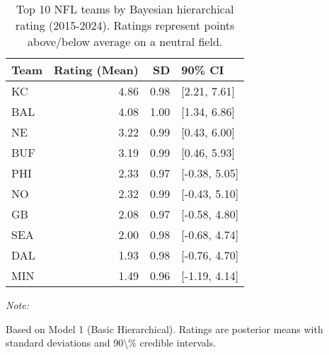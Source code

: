 \begin{table}[!h]
\centering
\caption{\label{tab:bayesian-top-teams}Top 10 NFL teams by Bayesian hierarchical rating (2015-2024). Ratings represent points above/below average on a neutral field.}
\centering
\begin{threeparttable}
\begin{tabular}[t]{lrrl}
\toprule
Team & Rating (Mean) & SD & 90\% CI\\
\midrule
KC & 4.86 & 0.98 & {}[2.21, 7.61]\\
BAL & 4.08 & 1.00 & {}[1.34, 6.86]\\
NE & 3.22 & 0.99 & {}[0.43, 6.00]\\
BUF & 3.19 & 0.99 & {}[0.46, 5.93]\\
PHI & 2.33 & 0.97 & {}[-0.38, 5.05]\\
\addlinespace
NO & 2.32 & 0.99 & {}[-0.43, 5.10]\\
GB & 2.08 & 0.97 & {}[-0.58, 4.80]\\
SEA & 2.00 & 0.98 & {}[-0.68, 4.74]\\
DAL & 1.93 & 0.98 & {}[-0.76, 4.70]\\
MIN & 1.49 & 0.96 & {}[-1.19, 4.14]\\
\bottomrule
\end{tabular}
\begin{tablenotes}
\item \textit{Note: } 
\item Based on Model 1 (Basic Hierarchical). Ratings are posterior means with standard deviations and 90\textbackslash{}\% credible intervals.
\end{tablenotes}
\end{threeparttable}
\end{table}
